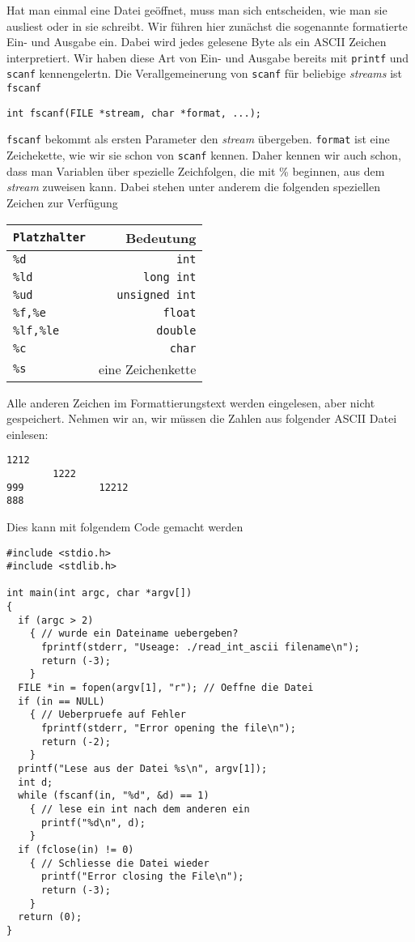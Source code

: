 Hat man einmal eine Datei geöffnet, muss man sich entscheiden, wie man sie ausliest oder in sie schreibt.
Wir führen hier zunächst die sogenannte formatierte Ein- und Ausgabe ein.
Dabei wird jedes gelesene Byte als ein ASCII Zeichen interpretiert.
Wir haben diese Art von Ein- und Ausgabe bereits mit \verb|printf| und \verb|scanf| kennengelertn.
Die Verallgemeinerung von \verb|scanf| für beliebige \emph{streams} ist \verb|fscanf|
\begin{lstlisting}
int fscanf(FILE *stream, char *format, ...);
\end{lstlisting}
\verb|fscanf| bekommt als ersten Parameter den \emph{stream} übergeben.
\verb|format| ist eine Zeichekette, wie wir sie schon von \verb|scanf| kennen.
Daher kennen wir auch schon, dass man Variablen über spezielle Zeichfolgen, die mit \% beginnen, aus dem \emph{stream} zuweisen kann.
Dabei stehen unter anderem die folgenden speziellen Zeichen zur Verfügung
\begin{center}
  \begin{tabular}{lr}
    \hline
    \texttt{Platzhalter} & Bedeutung \\\hline
    \texttt{\%d}	&  \texttt{int} \\
    \texttt{\%ld}  &  \texttt{long int} \\
    \texttt{\%ud}  &  \texttt{unsigned int} \\
    \texttt{\%f,\%e}   & \texttt{float} \\
    \texttt{\%lf,\%le}  & \texttt{double} \\
    \texttt{\%c}  & \texttt{char} \\
    \texttt{\%s}  & eine Zeichenkette\\
    \hline
  \end{tabular}
\end{center}
Alle anderen Zeichen im Formattierungstext werden eingelesen, aber nicht gespeichert. 
Nehmen wir an, wir müssen die Zahlen aus folgender ASCII Datei einlesen:
\begin{verbatim}
1212
        1222
999             12212
888
\end{verbatim}
Dies kann mit folgendem Code gemacht werden
\begin{lstlisting}
#include <stdio.h>
#include <stdlib.h>

int main(int argc, char *argv[])
{
  if (argc > 2)
    { // wurde ein Dateiname uebergeben?
      fprintf(stderr, "Useage: ./read_int_ascii filename\n");
      return (-3);
    }
  FILE *in = fopen(argv[1], "r"); // Oeffne die Datei
  if (in == NULL)
    { // Ueberpruefe auf Fehler
      fprintf(stderr, "Error opening the file\n");
      return (-2);
    }
  printf("Lese aus der Datei %s\n", argv[1]);
  int d;
  while (fscanf(in, "%d", &d) == 1)
    { // lese ein int nach dem anderen ein
      printf("%d\n", d);
    }
  if (fclose(in) != 0)
    { // Schliesse die Datei wieder
      printf("Error closing the File\n");
      return (-3);
    }
  return (0);
}
\end{lstlisting}
